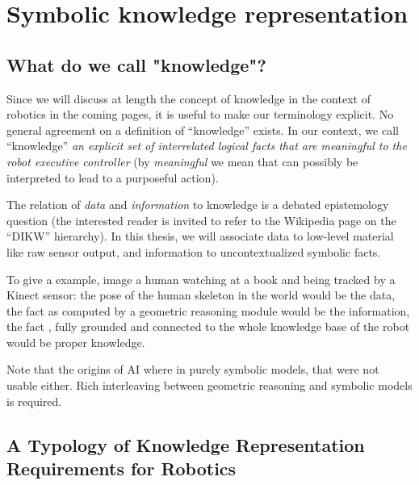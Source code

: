 \chapter{Symbolic knowledge representation}


\section{What do we call "knowledge"?}
\label{sect|on-knowledge}


Since we will discuss at length the concept of knowledge in the context
of robotics in the coming pages, it is useful to make our terminology explicit.  No general
agreement on a definition of ``knowledge'' exists. In our context, we call
``knowledge'' \emph{an explicit set of interrelated logical facts that are
meaningful to the robot executive controller} (by \emph{meaningful} we mean
that can possibly be interpreted to lead to a purposeful action).

The relation of \emph{data} and \emph{information} to knowledge is a debated
epistemology question (the interested reader is invited to refer to the
Wikipedia page on the ``DIKW'' hierarchy). In this thesis, we will associate
data to low-level material like raw sensor output, and information to
uncontextualized symbolic facts.

To give a example, image a human watching at a book and being tracked by a
Kinect sensor: the pose of the human skeleton in the world would be the data,
the fact  as computed by a geometric reasoning
module would be the information, the fact , fully grounded and connected to the whole knowledge base of
the robot would be proper knowledge.

Note that the origins of AI where in purely symbolic models, that were
not usable either. Rich interleaving between geometric reasoning and symbolic
models is required.

\section{A Typology of Knowledge Representation Requirements for Robotics}
\label{sect|features}

